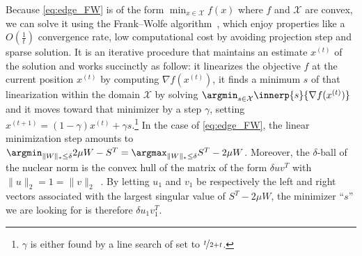 Because \eqref{eq:edge_FW} is of the form $\min_{x\in \mathcal{X}} f(x)$ where $f$ and $\mathcal{X}$
are convex, we can solve it using the Frank--Wolfe algorithm~\autocites{FrankWolfe56}{Jaggi2013a},
which enjoy properties like a $O(\frac{1}{t})$ convergence rate, low computational cost by avoiding
projection step and sparse solution. It is an iterative procedure that maintains an estimate
$x^{(t)}$ of the solution and works succinctly as follow: it linearizes the objective $f$ at the
current position $x^{(t)}$ by computing $\nabla f(x^{(t)})$, it finds a minimum $s$ of that
linearization within the domain $\mathcal{X}$ by solving $\argmin_{s\in \mathcal{X}}
\innerp{s}{\nabla f(x^{(t)})}$ and it moves toward that minimizer by a step $\gamma$, setting
$x^{(t+1)} = (1-\gamma) x^{(t)} + \gamma s$.\footnote{$\gamma$ is either found by a line search of
set to $\nicefrac{t}{2+t}$.} In the case of \eqref{eq:edge_FW}, the linear minimization step amounts
to $\argmin_{\|W\|_* \leq \delta} 2\mu W - S^T = \argmax_{\|W\|_* \leq \delta} S^T - 2\mu W$.
Moreover, the $\delta$-ball of the nuclear norm is the convex hull of the matrix of the form $\delta
u v^T$ with $\|u\|_2 = 1 = \|v\|_2$~\autocite{Jaggi2013a}. By letting $u_1$ and $v_1$ be
respectively the left and right vectors associated with the largest singular value of $S^T - 2\mu
W$, the minimizer \enquote{$s$} we are looking for is therefore $\delta u_1 v_1^T$.

